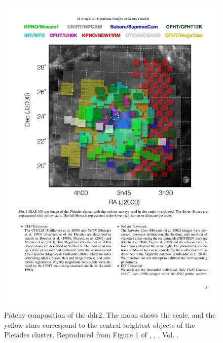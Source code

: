 \begin{figure}[ht!]
\begin{center}
\includegraphics[width=\textwidth]{background/Figures/F1_Bouy2013.pdf}
\caption{Patchy composition of the \gls{ddr2}. The moon shows the scale, and the yellow stars correspond to the central brightest objects of the Pleiades cluster. Reproduced from Figure 1 of \citet{Bouy2013}, \textit{}, , Vol. .}
\label{fig:originDANCeDR2}
\end{center}
\end{figure}

